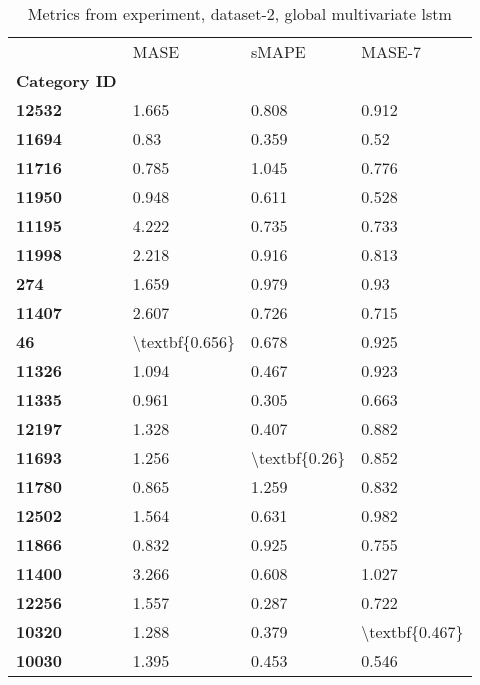 \begin{table}[h]
\centering
\caption{Metrics from experiment, dataset-2, global multivariate lstm}
\label{table:global-multivariate-lstm-dataset-2}
\begin{tabular}{llll}
\toprule
{} &            MASE &          sMAPE &          MASE-7 \\
\textbf{Category ID} &                 &                &                 \\
\midrule
\textbf{12532      } &           1.665 &          0.808 &           0.912 \\
\textbf{11694      } &            0.83 &          0.359 &            0.52 \\
\textbf{11716      } &           0.785 &          1.045 &           0.776 \\
\textbf{11950      } &           0.948 &          0.611 &           0.528 \\
\textbf{11195      } &           4.222 &          0.735 &           0.733 \\
\textbf{11998      } &           2.218 &          0.916 &           0.813 \\
\textbf{274        } &           1.659 &          0.979 &            0.93 \\
\textbf{11407      } &           2.607 &          0.726 &           0.715 \\
\textbf{46         } &  \textbackslash textbf\{0.656\} &          0.678 &           0.925 \\
\textbf{11326      } &           1.094 &          0.467 &           0.923 \\
\textbf{11335      } &           0.961 &          0.305 &           0.663 \\
\textbf{12197      } &           1.328 &          0.407 &           0.882 \\
\textbf{11693      } &           1.256 &  \textbackslash textbf\{0.26\} &           0.852 \\
\textbf{11780      } &           0.865 &          1.259 &           0.832 \\
\textbf{12502      } &           1.564 &          0.631 &           0.982 \\
\textbf{11866      } &           0.832 &          0.925 &           0.755 \\
\textbf{11400      } &           3.266 &          0.608 &           1.027 \\
\textbf{12256      } &           1.557 &          0.287 &           0.722 \\
\textbf{10320      } &           1.288 &          0.379 &  \textbackslash textbf\{0.467\} \\
\textbf{10030      } &           1.395 &          0.453 &           0.546 \\
\bottomrule
\end{tabular}
\end{table}
